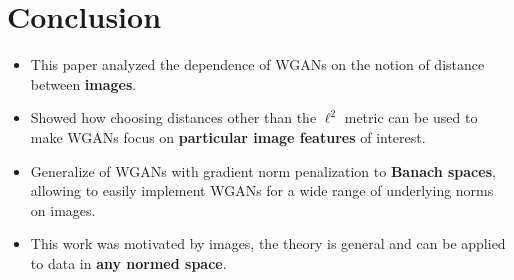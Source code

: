 \documentclass[landscape,headrule,footrule]{foils}
\begin{document}
\section{Conclusion}
\tableofcontents
\begin{frame}[\secname]
\begin{flushleft}
\begin{itemize}
\item This paper analyzed the dependence of WGANs on the notion of distance between \textbf{images}. \\
\item Showed how choosing distances other than the $\ell^2$ metric can be used to make WGANs focus on \textbf{particular image features} of interest. \\
\item Generalize of WGANs with gradient norm penalization to \textbf{Banach spaces}, allowing to easily implement WGANs for a wide range of underlying norms on images. \\
\item This work was motivated by images, the theory is general and can be applied to data in \textbf{any normed space}.
\end{itemize}
\end{flushleft}
\end{frame}


\endslide
\end{document}
